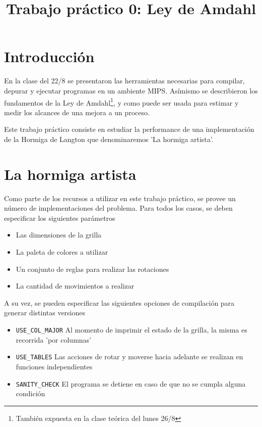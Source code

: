 \documentclass{article}
\author{}
\title{Trabajo práctico 0: Ley de Amdahl}
\begin{document}
\date{}
\maketitle

\section{Introducción}

En la clase del 22/8 se presentaron las herramientas necesarias para compilar, depurar y ejecutar programas en un 
ambiente MIPS. Asímismo se describieron los fundamentos de la Ley de Amdahl\footnote{También expuesta en la clase
teórica del lunes 26/8}, y como puede ser usada para estimar y medir los alcances de una mejora a un proceso.

Este trabajo práctico consiste en estudiar la performance de una implementación de la Hormiga de Langton que 
denominaremos 'La hormiga artista'. 

\section{La hormiga artista}

Como parte de los recursos a utilizar en este trabajo práctico, se provee un número de implementaciones del problema.
Para todos los casos, se deben especificar los siguientes parámetros
\begin{itemize}
\item Las dimensiones de la grilla
\item La paleta de colores a utilizar
\item Un conjunto de reglas para realizar las rotaciones
\item La cantidad de movimientos a realizar
\end{itemize}

A su vez, se pueden especificar las siguientes opciones de compilación para generar distintas versiones
\begin{itemize}
\item \texttt{USE\_COL\_MAJOR}
Al momento de imprimir el estado de la grilla, la misma es recorrida 'por columnas'
\item \texttt{USE\_TABLES}
Las acciones de rotar y moverse hacia adelante se realizan en funciones independientes
\item \texttt{SANITY\_CHECK}
El programa se detiene en caso de que no se cumpla alguna condición
\end{itemize}
\end{document}
